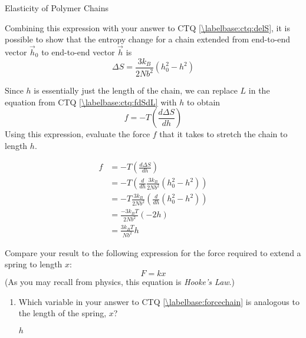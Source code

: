 \begin{activity}{Elasticity of Polymer Chains}
\begin{infobox}
	Combining this expression with your answer to CTQ \ref{\labelbase:ctq:delS}, it is possible to show that the entropy change for a chain extended from end-to-end vector $\vec h_0$ to end-to-end vector $\vec h$ is
	\begin{equation*}
		\Delta S = \frac{3 k_B}{2 Nb^2}\left( h_0^2 - h^2 \right)
	\end{equation*}
	
\end{infobox}

\begin{ctqs}
	
	\question Since $h$ is essentially just the length of the chain, we can replace $L$ in the equation from CTQ \ref{\labelbase:ctq:fdSdL} with $h$ to obtain
		\begin{equation*}
			f = -T\left(\frac{d\Delta S}{dh}\right)
		\end{equation*}
		Using this expression, evaluate the force $f$ that it takes to stretch the chain to length $h$.
		\label{\labelbase:forcechain}
		
		\begin{solution}[2in]{}
			\begin{align*}
				f &= -T\left(\frac{d\Delta S}{dh}\right) \\
				  &= -T\left(\frac{d}{dh} \frac{3 k_B}{2 Nb^2}\left( h_0^2 - h^2 \right) \right) \\
				  &= -T \frac{3 k_B}{2 Nb^2} \left(\frac{d}{dh} \left( h_0^2 - h^2 \right) \right) \\
				  &= \frac{-3 k_B T}{2 Nb^2} (-2h)\\
				  &= \frac{3 k_B T}{Nb^2} h
			\end{align*}
		\end{solution}
		
	\question Compare your result to the following expression for the force required to extend a spring to length $x$:
		\begin{equation*}
			F = kx
		\end{equation*}
		(As you may recall from physics, this equation is \emph{Hooke's Law}.)
		
		\begin{enumerate}
			\item Which variable in your answer to CTQ \ref{\labelbase:forcechain} is analogous to the length of the spring, $x$?
		
				\begin{solution}[0.25in]{}
					$h$
				\end{solution}
			

\end{enumerate}
\end{ctqs}
\end{activity}
